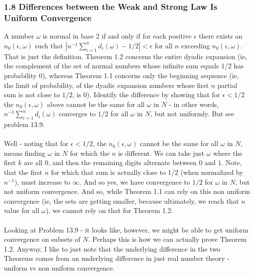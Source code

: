 \documentclass[12pt,a4paper]{article}
\newcommand{\1}[1]{\mathbbm{1}\left\{ #1 \right\}}
\begin{document}
\subsubsection{1.8 Differences between the Weak and Strong Law Is Uniform Convergence} A number $\omega$ is normal in base 2 if and only if for each positive $\epsilon$ there exists an $n_0(\epsilon,\omega)$ such that $|n^{-1}\sum_{i=1}^n d_i(\omega) - 1/2| < \epsilon$ for all $n$ exceeding $n_0(\epsilon,\omega)$. That is just the definition. Theorem 1.2 concerns the entire dyadic expansion (ie, the complement of the set of normal numbers whose infinite sum equals 1/2 has probability $0$), whereas Theorem 1.1 concerns only the beginning sequence (ie, the limit of probability, of the dyadic expansion numbers whose first $n$ partial sum is not close to $1/2$, is 0). Identify the difference by showing that for $\epsilon < 1/2$ the $n_0(\epsilon,\omega)$ above cannot be the same for all $\omega$ in $N$ - in other words, $n^{-1}\sum_{i=1}^n d_i(\omega)$ converges to $1/2$ for all $\omega$ in $N$, but not uniformly. But see problem 13.9.
\\\\
Well - noting that for $\epsilon < 1/2$, the $n_0(\epsilon,\omega)$ cannot be the same for all $\omega$ in $N$, means finding $\omega$ in $N$ for which the $n$ is different. We can take just $\omega$ where the first $k$ are all $0$, and then the remaining digits alternate between $0$ and $1$. Note, that the first $n$ for which that sum is actually close to $1/2$ (when normalized by $n^{-1}$), must increase to $\infty$. And so yes, we have convergence to $1/2$ for $\omega$ in $N$, but not uniform convergence. And so, while Theorem 1.1 can rely on this non uniform convergence (ie, the sets are getting smaller, because ultimately, we reach that $n$ value for all $\omega$), we cannot rely on that for Theorem 1.2.
\\\\
Looking at Problem 13.9 - it looks like, however, we might be able to get uniform convergence on subsets of $N$. Perhaps this is how we can actually prove Theorem 1.2. Anyway, I like to just note that the underlying difference in the two Theorems comes from an underlying difference in just real number theory - uniform vs non uniform convergence.
\end{document}
